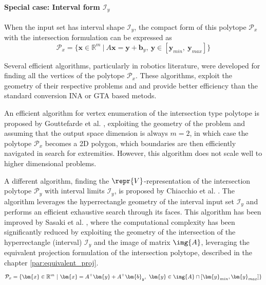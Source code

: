 \paragraph*{Special case: Interval form $\mathcal{I}_y$}
\label{par:intersection_interval_algos_v}

When the input set has interval shape $\mathcal{I}_y$, the compact form of this polytope  $\mathcal{P}_x$ with the intersection formulation can be expressed as
\begin{equation}
    \mathcal{P}_x=\{\bm{x}\in\mathbb{R}^m ~ |~ A\bm{x} = \bm{y} + \bm{b}_y,~ \bm{y} \in [\bm{y}_{min},~  \bm{y}_{max}]  \}
    \label{eq:inter_hyp_revisit}
\end{equation}

Several efficient algorithms, particularly in robotics literature, were developed for finding all the vertices of the polytope $\mathcal{P}_x$. These algorithms, exploit the geometry of their respective problems and and provide better efficiency than the standard conversion INA or GTA based metods.

An efficient algorithm for vertex enumeration of the intersection type polytope is proposed by Gouttefarde et al. \cite{gouttefarde_versatile_2015}, exploiting the geometry of the problem and assuming that the output space dimension is always $m=2$, in which case the polytope $\mathcal{P}_x$ becomes a 2D polygon, which boundaries are then efficiently navigated in search for extremities. However, this algorithm does not scale well to higher dimensional problems.

A different algorithm, finding the $\repr{V}$-representation of the intersection polytope $\mathcal{P}_y$ with interval limits $\mathcal{I}_y$, is proposed by Chiacchio et al. \cite{chiacchio_evaluation_1996}. The algorithm leverages the hyperrectangle geometry of the interval input set $\mathcal{I}_y$ and performs an efficient exhaustive search through its faces. This algorithm has been improved by Sasaki et al. \cite{sasaki_vertex_nodate}, where the computational complexity has been significantly reduced by exploiting the geometry of the intersection of the hyperrectangle (interval) $\mathcal{I}_y$ and the image of matrix $\img{A}$, leveraging the equivalent projection formulation of the intersection polytope, described in the chapter \ref{par:equivalent_proj}.
\begin{equation}
\mathcal{P}_x=\{\bm{x}\in\mathbb{R}^m ~|~ \bm{x} = A^+\bm{y} + A^+\bm{b}_y,~ \bm{y} \in \img{A}\cap[\bm{y}_{min},\bm{y}_{max}]\}
\label{eq:inter_hyp_inter}
\end{equation}

